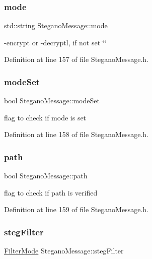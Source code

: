 \subsubsection{\texorpdfstring{mode}{mode}}
{\footnotesize\ttfamily std\+::string Stegano\+Message\+::mode\hspace{0.3cm}{\ttfamily [private]}}

-\/encrypt or -\/decryptl, if not set \char`\"{}\char`\"{} 

Definition at line 157 of file Stegano\+Message.\+h.

\mbox{\label{classSteganoMessage_ae1da17c621a8db71fa4eb3b148a82ceb}} 
\subsubsection{\texorpdfstring{modeSet}{modeSet}}
{\footnotesize\ttfamily bool Stegano\+Message\+::mode\+Set\hspace{0.3cm}{\ttfamily [private]}}

flag to check if mode is set 

Definition at line 158 of file Stegano\+Message.\+h.

\mbox{\label{classSteganoMessage_a399f4c181d3b7b15ccdb5c925a7a1f51}} 
\subsubsection{\texorpdfstring{path}{path}}
{\footnotesize\ttfamily bool Stegano\+Message\+::path\hspace{0.3cm}{\ttfamily [private]}}

flag to check if path is verified 

Definition at line 159 of file Stegano\+Message.\+h.

\mbox{\label{classSteganoMessage_af20fb772ae34deaccd23144b38f06320}} 
\subsubsection{\texorpdfstring{stegFilter}{stegFilter}}
{\footnotesize\ttfamily \mbox{\hyperlink{constants_8h_a36bd51b89b9e0e6e4dbbe565b9155083}{Filter\+Mode}} Stegano\+Message\+::steg\+Filter\hspace{0.3cm}{\ttfamily [private]}}

